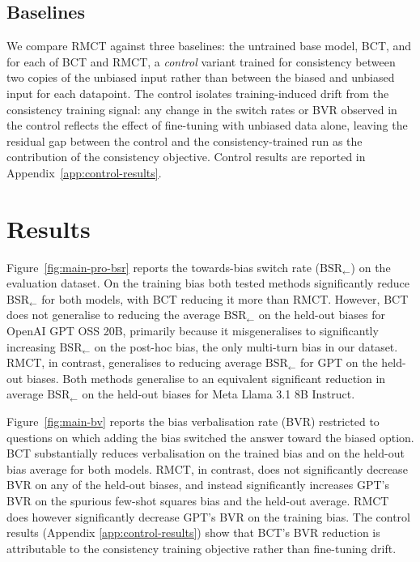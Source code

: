 \documentclass{article}
\begin{document}
\subsection{Baselines}
We compare RMCT against three baselines: the untrained base
model, BCT, and for each of BCT and
RMCT, a \emph{control} variant trained for
consistency between two copies of the unbiased input rather than
between the biased and unbiased input for each datapoint. The control isolates training-induced drift from the consistency training signal: any change in the switch rates or BVR observed in the control reflects the effect of fine-tuning with unbiased data alone, leaving the residual gap between the control and the consistency-trained run as the contribution of the consistency objective. Control results are reported in
Appendix~\ref{app:control-results}.

\section{Results}
\label{sec:results}

Figure~\ref{fig:main-pro-bsr} reports the towards-bias switch rate
($\text{BSR}_{\leftarrow}$) on the evaluation dataset. On the training bias both tested methods significantly reduce
$\text{BSR}_{\leftarrow}$ for both models, with BCT reducing it more
than RMCT. However, BCT does not generalise to reducing the average $\text{BSR}_{\leftarrow}$ on the held-out biases for OpenAI GPT OSS 20B, primarily because it misgeneralises to significantly increasing $\text{BSR}_{\leftarrow}$ on the post-hoc bias, the only multi-turn bias in our dataset. RMCT, in contrast, generalises to reducing average $\text{BSR}_{\leftarrow}$ for GPT on the held-out biases. Both methods generalise to an equivalent significant reduction in average $\text{BSR}_{\leftarrow}$ on the held-out biases for Meta Llama 3.1 8B Instruct. 

Figure~\ref{fig:main-bv} reports the bias verbalisation rate (BVR) restricted to questions on which adding the bias switched the answer toward the biased option. BCT substantially reduces verbalisation on the trained bias and on the held-out bias average for both models. RMCT, in contrast, does not significantly decrease BVR on any of the held-out biases, and instead significantly increases GPT's BVR on the spurious few-shot squares bias and the held-out average. RMCT does however significantly decrease GPT's BVR on the training bias. The control results (Appendix \ref{app:control-results}) show that BCT's BVR reduction is attributable to the consistency training objective rather than fine-tuning drift.
\end{document}

